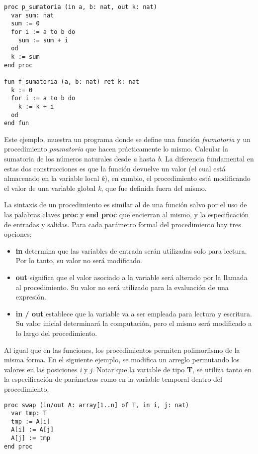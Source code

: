 \documentclass{article}
\begin{document}
\begin{lstlisting}
proc p_sumatoria (in a, b: nat, out k: nat)
  var sum: nat
  sum := 0
  for i := a to b do
    sum := sum + i
  od
  k := sum
end proc

fun f_sumatoria (a, b: nat) ret k: nat
  k := 0
  for i := a to b do
    k := k + i
  od
end fun
\end{lstlisting}

Este ejemplo, muestra un programa donde se define una función \textit{f\gbajo sumatoria} y un procedimiento \textit{p\gbajo sumatoria} que hacen prácticamente lo mismo.
Calcular la sumatoria de los números naturales desde \textit{a} hasta \textit{b}.
La diferencia fundamental en estas dos construcciones es que la función devuelve un valor (el cual está almacenado en la variable local \textit{k}), en cambio, el procedimiento está modificando el valor de una variable global \textit{k}, que fue definida fuera del mismo.

La sintaxis de un procedimiento es similar al de una función salvo por el uso de las palabras claves \textbf{proc} y \textbf{end proc} que encierran al mismo, y la especificación de entradas y salidas.
Para cada parámetro formal del procedimiento hay tres opciones:

\begin{itemize}
\item \textbf{in} determina que las variables de entrada serán utilizadas solo para lectura.
Por lo tanto, su valor no será modificado.
\item \textbf{out} significa que el valor asociado a la variable será alterado por la llamada al procedimiento.
Su valor no será utilizado para la evaluación de una expresión.
\item \textbf{in / out} establece que la variable va a ser empleada para lectura y escritura.
Su valor inicial determinará la computación, pero el mismo será modificado a lo largo del procedimiento.
\end{itemize}

Al igual que en las funciones, los procedimientos permiten polimorfismo de la misma forma.
En el siguiente ejemplo, se modifica un arreglo permutando los valores en las posiciones \textit{i} y \textit{j}.
Notar que la variable de tipo \textbf{T}, se utiliza tanto en la especificación de parámetros como en la variable temporal dentro del procedimiento.

\begin{lstlisting}
proc swap (in/out A: array[1..n] of T, in i, j: nat)
  var tmp: T
  tmp := A[i]
  A[i] := A[j]
  A[j] := tmp
end proc
\end{lstlisting}
\end{document}
